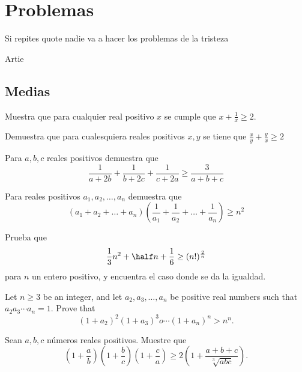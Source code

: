 \documentclass[11pt]{scrartcl}
\begin{document}
\section{Problemas}
\epigraph{Si repites quote nadie va a hacer los problemas de la tristeza}{ Artie }
\subsection{Medias}
\begin{problem}
    Muestra que para cualquier real positivo $x$ se cumple que $x+\frac 1x \geq 2$.

\end{problem}
\begin{problem}
    Demuestra que para cualesquiera reales positivos $x,y$ se tiene que $\frac xy + \frac yx \geq 2$
   
\end{problem}
\begin{problem}
    Para $a,b,c$ reales positivos demuestra que 
    \[\frac{1}{a+2b}+\frac{1}{b+2c}+\frac{1}{c+2a} \geq \frac{3}{a+b+c}\]
\end{problem}
\begin{problem}
    Para reales positivos $a_1,a_2,\ldots,a_n$ demuestra que 
    \[(a_1+a_2+\ldots+a_n)\left(\frac{1}{a_1}+\frac{1}{a_2}+\ldots+\frac{1}{a_n}\right)\geq n^2\]
 
\end{problem}
\begin{problem} 
Prueba que 
$$\frac 1 3 n^2 +\half n +\frac 1 6 \geq (n!)^{\frac 2 n} $$
para $n$ un entero positivo, y encuentra el caso donde se da la igualdad.
\end{problem}
\begin{problem} [IMO 2012/2]
    Let $n\ge 3$ be an integer, and let $a_2,a_3,\ldots ,a_n$ be positive real numbers such that $a_{2}a_{3}\cdots a_{n}=1$. Prove that
\[(1 + a_2)^2 (1 + a_3)^3o \dotsm (1 + a_n)^n > n^n.\]
\end{problem}
\begin{problem} [APMO 1998/3]
    Sean $a, b, c$ n\'umeros reales positivos. Muestre que
    \begin{equation*}
        \left(1 + \frac{a}{b}\right)\left(1 + \frac{b}{c}\right)\left(1 + \frac{c}{a}\right) \geq 2\left(1+\frac{a+b+c}{\sqrt[3]{abc}}\right).
    \end{equation*}

\end{problem}
\end{document}
